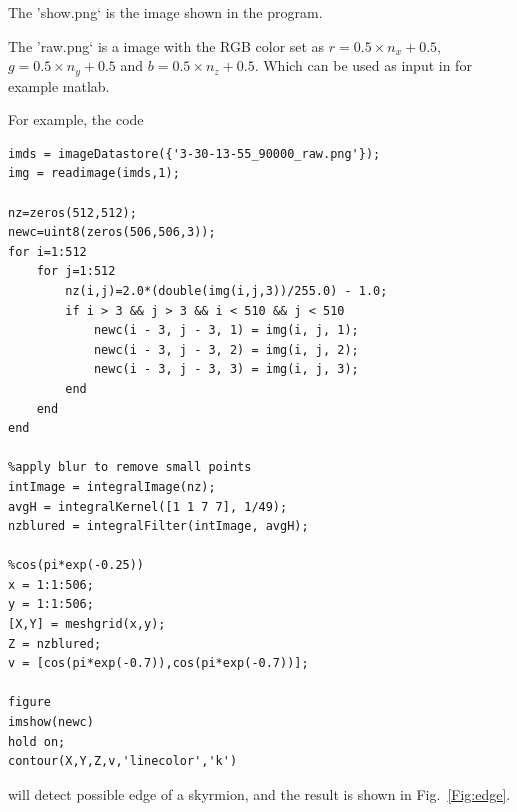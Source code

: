 \documentclass[aps,superscriptaddress,groupedaddress]{revtex4}  %
\begin{document}
The 'show.png` is the image shown in the program.

The 'raw.png` is a image with the RGB color set as $r=0.5\times n_x+0.5$, $g=0.5\times n_y+0.5$ and $b=0.5\times n_z+0.5$. Which can be used as input in for example matlab.

For example, the code
\begin{lstlisting}
imds = imageDatastore({'3-30-13-55_90000_raw.png'});
img = readimage(imds,1);

nz=zeros(512,512);
newc=uint8(zeros(506,506,3));
for i=1:512
    for j=1:512
        nz(i,j)=2.0*(double(img(i,j,3))/255.0) - 1.0;
        if i > 3 && j > 3 && i < 510 && j < 510
            newc(i - 3, j - 3, 1) = img(i, j, 1);
            newc(i - 3, j - 3, 2) = img(i, j, 2);
            newc(i - 3, j - 3, 3) = img(i, j, 3);
        end
    end
end

%apply blur to remove small points
intImage = integralImage(nz);
avgH = integralKernel([1 1 7 7], 1/49);
nzblured = integralFilter(intImage, avgH);

%cos(pi*exp(-0.25))
x = 1:1:506;
y = 1:1:506;
[X,Y] = meshgrid(x,y);
Z = nzblured;
v = [cos(pi*exp(-0.7)),cos(pi*exp(-0.7))];

figure
imshow(newc)
hold on;
contour(X,Y,Z,v,'linecolor','k')
\end{lstlisting}
will detect possible edge of a skyrmion, and the result is shown in Fig.~\ref{Fig:edge}.
\end{document}
